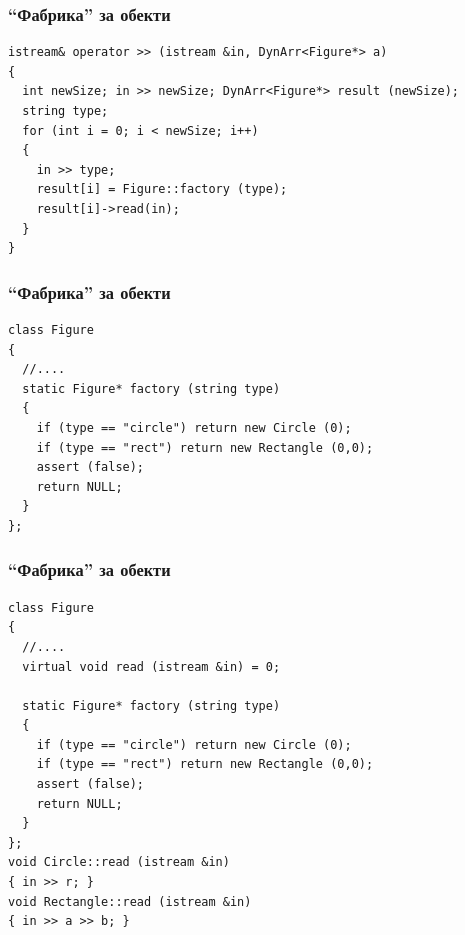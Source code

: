\documentclass{beamer}
\begin{document}
\begin{frame}[fragile]
\frametitle{``Фабрика'' за обекти}


\begin{flushleft}
\begin{lstlisting}
istream& operator >> (istream &in, DynArr<Figure*> a)
{
  int newSize; in >> newSize; DynArr<Figure*> result (newSize);
  string type;
  for (int i = 0; i < newSize; i++)
  {
    in >> type;
    result[i] = Figure::factory (type);
    result[i]->read(in);
  }
}
\end{lstlisting}
\end{flushleft}


\end{frame}



\begin{frame}[fragile]
\frametitle{``Фабрика'' за обекти}


\begin{flushleft}
\begin{lstlisting}
class Figure
{
  //....
  static Figure* factory (string type)
  {
    if (type == "circle") return new Circle (0);
    if (type == "rect") return new Rectangle (0,0);
    assert (false);
    return NULL;
  }
};
\end{lstlisting}
\end{flushleft}


\end{frame}


\begin{frame}[fragile]
\frametitle{``Фабрика'' за обекти}


\begin{flushleft}
\begin{lstlisting}
class Figure
{
  //....
  virtual void read (istream &in) = 0;

  static Figure* factory (string type)
  {
    if (type == "circle") return new Circle (0);
    if (type == "rect") return new Rectangle (0,0);
    assert (false);
    return NULL;
  }
};
void Circle::read (istream &in)
{ in >> r; }
void Rectangle::read (istream &in)
{ in >> a >> b; }
\end{lstlisting}
\end{flushleft}


\end{frame}
\end{document}
